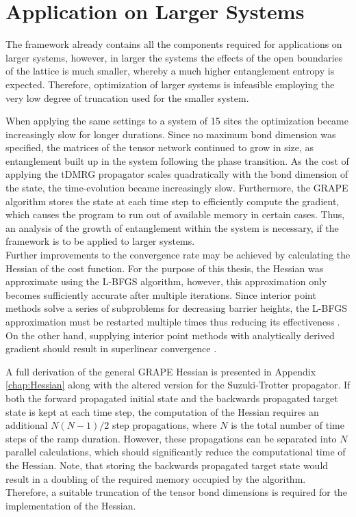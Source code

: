\section{Application on Larger Systems} \label{sec:appLargeSystems}

The framework already contains all the components required for applications on larger systems, however, in larger the systems the effects of the open boundaries of the lattice is much smaller, whereby a much higher entanglement entropy is expected. Therefore, optimization of larger systems is infeasible employing the very low degree of truncation used for the smaller system. 

When applying the same settings to a system of 15 sites the optimization became increasingly slow for longer durations. Since no maximum bond dimension was specified, the matrices of the tensor network continued to grow in size, as entanglement built up in the system following the phase transition. As the cost of applying the tDMRG propagator scales quadratically with the bond dimension of the state, the time-evolution became increasingly slow. Furthermore, the GRAPE algorithm stores the state at each time step to efficiently compute the gradient, which causes the program to run out of available memory in certain cases. Thus, an analysis of the growth of entanglement within the system is necessary, if the framework is to be applied to larger systems.\\

Further improvements to the convergence rate may be achieved by calculating the Hessian of the cost function. For the purpose of this thesis, the Hessian was approximate using the L-BFGS algorithm, however, this approximation only becomes sufficiently accurate after multiple iterations. Since interior point methods solve a series of subproblems for decreasing barrier heights, the L-BFGS approximation must be restarted multiple times thus reducing its effectiveness \cite{Wachter2006}. On the other hand, supplying interior point methods with analytically derived gradient should result in superlinear convergence \cite{wright}.

A full derivation of the general GRAPE Hessian is presented in Appendix \ref{chap:Hessian} along with the altered version for the Suzuki-Trotter propagator. If both the forward propagated initial state and the backwards propagated target state is kept at each time step, the computation of the Hessian requires an additional $N(N - 1)/2$ step propagations, where $N$ is the total number of time steps of the ramp duration. However, these propagations can be separated into $N$ parallel calculations, which should significantly reduce the computational time of the Hessian. Note, that storing the backwards propagated target state would result in a doubling of the required memory occupied by the algorithm. Therefore, a suitable truncation of the tensor bond dimensions is required for the implementation of the Hessian.


